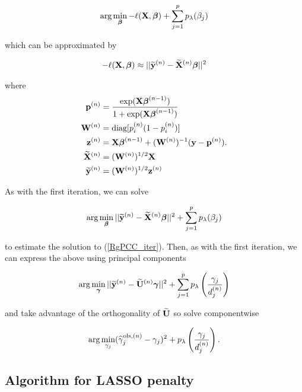\documentclass[main.tex]{subfiles}
\begin{document}
\begin{align}
	\text{arg} \min_{\boldsymbol \beta} - \ell(\mathbf{X}, \boldsymbol \beta) + \sum_{j = 1}^p p_{\lambda}(\beta_j)
\end{align}

which can be approximated by

\begin{align}
	- \ell(\mathbf{X}, \boldsymbol \beta) \approx || \widetilde{\mathbf{y}}^{(n)} - \widetilde{\mathbf{X}}^{(n)} \boldsymbol \beta ||^2 \label{RgPCC_iter}
\end{align}

where
\begin{align}
	\mathbf{p}^{(n)} &= \dfrac{\text{exp}(\mathbf{X} \boldsymbol \beta^{(n-1)})}{1 + \text{exp}(\mathbf{X} \boldsymbol \beta^{(n-1)})} \label{pdef}\\
    \mathbf{W}^{(n)} &= \text{diag}[p_i^{(n)}(1-p_i^{(n)})] \label{Wdef}\\
    \mathbf{z}^{(n)} &= \mathbf{X} \boldsymbol \beta^{(n-1)} + (\mathbf{W}^{(n)})^{-1}(\mathbf{y} - \mathbf{p}^{(n)}). \label{zdef} \\
	\widetilde{\mathbf{X}}^{(n)} &= (\mathbf{W}^{(n)})^{1/2} \mathbf{X} \\
	\widetilde{\mathbf{y}}^{(n)} &= (\mathbf{W}^{(n)})^{1/2} \mathbf{z}^{(n)}
\end{align}

As with the first iteration, we can solve

\begin{align}
	\text{arg} \min_{\boldsymbol \beta} || \widetilde{\mathbf{y}}^{(n)} - \widetilde{\mathbf{X}}^{(n)} \boldsymbol \beta ||^2 + \sum_{j = 1}^p p_{\lambda}(\beta_j)
\end{align}

to estimate the solution to (\ref{RgPCC_iter}). Then, as with the first iteration, we can express the above using principal components

\begin{align}
	\text{arg} \min_{\boldsymbol \gamma} ||\widetilde{\mathbf{y}}^{(n)} - \widetilde{\mathbf{U}}^{(n)} \boldsymbol \gamma ||^2 + \sum_{j = 1}^p p_{\lambda} \left (\frac{\gamma_j}{d_j^{(n)}} \right )
\end{align}

and take advantage of the orthogonality of $\widetilde{\mathbf{U}}$ so solve componentwise

\begin{align}
	\text{arg} \min_{\gamma_j} (\widehat{\gamma}_j^{\text{ols}, (n)} - \gamma_j)^2 + p_{\lambda} \left (\frac{\gamma_j}{d_j^{(n)}} \right ). \label{RgPCC_princ_iter}
\end{align}

\subsection{Algorithm for LASSO penalty}
\end{document}
